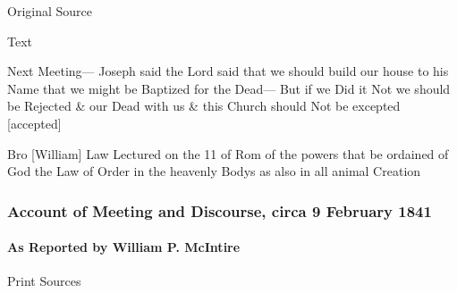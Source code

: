 				
				\begin{description}
					\item[Original Source]
				\end{description}
				
				
				\begin{description}
					\item[Text]
				\end{description}
				
					Next Meeting--- Joseph said the Lord said that we should build our house to his Name that we might be Baptized for the Dead--- But if we Did it Not we should be Rejected \& our Dead with us \& this Church should Not be excepted [accepted]
				
					Bro [William] Law Lectured on the 11 of Rom of the powers that be ordained of God the Law of Order in the heavenly Bodys as also in all animal Creation
					
		\subsubsection{Account of Meeting and Discourse, circa 9 February 1841}
			\label{EMS-1841-JS-CIR-9-FEB-1841}
			
			\paragraph{As Reported by William P. McIntire}
				\label{EMS-1841-JS-CIR-9-FEB-1841-WM}
			
				\begin{description}
					\item[Print Sources]
				\end{description}

